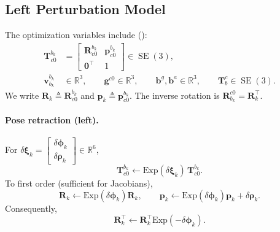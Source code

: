\subsection{Left Perturbation Model}

The optimization variables include ():
\begin{equation}
\begin{aligned}
\mathbf{T}_{c0}^{b_k}
&=
\begin{bmatrix}
\mathbf{R}_{c0}^{b_k} & \mathbf{p}_{c0}^{b_k}\\
\mathbf{0}^\top & 1
\end{bmatrix}\in\operatorname{SE}(3),\\
\mathbf{v}_{b_k}^{b_k} &\in\mathbb{R}^3,\qquad
\mathbf{g}^{c0}\in\mathbb{R}^3,\qquad
\mathbf{b}^g,\mathbf{b}^a\in\mathbb{R}^3,\qquad
\mathbf{T}_b^c\in\operatorname{SE}(3).
\end{aligned}
\end{equation}
We write $\mathbf{R}_k \triangleq \mathbf{R}_{c0}^{b_k}$ and $\mathbf{p}_k \triangleq \mathbf{p}_{c0}^{b_k}$.
The inverse rotation is $\mathbf{R}_{b_k}^{c0}=\mathbf{R}_k^\top$.

\paragraph{Pose retraction (left).}
For $\delta\boldsymbol{\xi}_k=\begin{bmatrix}\delta\boldsymbol{\phi}_k\\\delta\boldsymbol{\rho}_k\end{bmatrix}\in\mathbb{R}^6$,
\begin{equation}
\mathbf{T}_{c0}^{b_k} \leftarrow \text{Exp}(\delta\boldsymbol{\xi}_k)\,\mathbf{T}_{c0}^{b_k}.
\end{equation}
To first order (sufficient for Jacobians),
\begin{equation}
\mathbf{R}_k \leftarrow \text{Exp}(\delta\boldsymbol{\phi}_k)\mathbf{R}_k,
\qquad
\mathbf{p}_k \leftarrow \text{Exp}(\delta\boldsymbol{\phi}_k)\mathbf{p}_k + \delta\boldsymbol{\rho}_k.
\label{eq:maci2:left_pose_update}
\end{equation}
Consequently,
\begin{equation}
\mathbf{R}_k^\top \leftarrow \mathbf{R}_k^\top \text{Exp}(-\delta\boldsymbol{\phi}_k).
\label{eq:maci2:left_pose_update_invR}
\end{equation}

